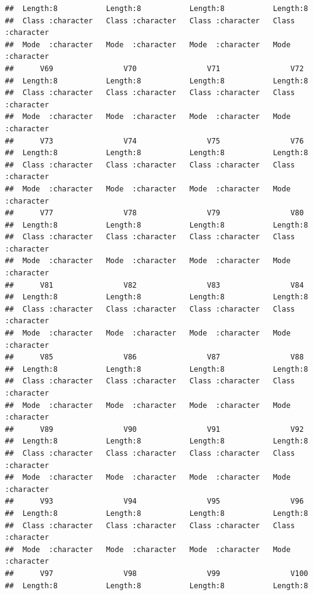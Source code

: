 \documentclass[
]{article}
\begin{document}
\begin{verbatim}
##  Length:8           Length:8           Length:8           Length:8          
##  Class :character   Class :character   Class :character   Class :character  
##  Mode  :character   Mode  :character   Mode  :character   Mode  :character  
##      V69                V70                V71                V72           
##  Length:8           Length:8           Length:8           Length:8          
##  Class :character   Class :character   Class :character   Class :character  
##  Mode  :character   Mode  :character   Mode  :character   Mode  :character  
##      V73                V74                V75                V76           
##  Length:8           Length:8           Length:8           Length:8          
##  Class :character   Class :character   Class :character   Class :character  
##  Mode  :character   Mode  :character   Mode  :character   Mode  :character  
##      V77                V78                V79                V80           
##  Length:8           Length:8           Length:8           Length:8          
##  Class :character   Class :character   Class :character   Class :character  
##  Mode  :character   Mode  :character   Mode  :character   Mode  :character  
##      V81                V82                V83                V84           
##  Length:8           Length:8           Length:8           Length:8          
##  Class :character   Class :character   Class :character   Class :character  
##  Mode  :character   Mode  :character   Mode  :character   Mode  :character  
##      V85                V86                V87                V88           
##  Length:8           Length:8           Length:8           Length:8          
##  Class :character   Class :character   Class :character   Class :character  
##  Mode  :character   Mode  :character   Mode  :character   Mode  :character  
##      V89                V90                V91                V92           
##  Length:8           Length:8           Length:8           Length:8          
##  Class :character   Class :character   Class :character   Class :character  
##  Mode  :character   Mode  :character   Mode  :character   Mode  :character  
##      V93                V94                V95                V96           
##  Length:8           Length:8           Length:8           Length:8          
##  Class :character   Class :character   Class :character   Class :character  
##  Mode  :character   Mode  :character   Mode  :character   Mode  :character  
##      V97                V98                V99                V100          
##  Length:8           Length:8           Length:8           Length:8          

\end{verbatim}
\end{document}
